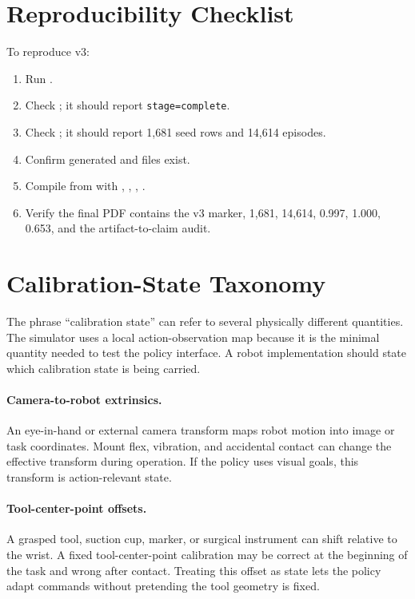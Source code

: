 \documentclass{article}
\begin{document}
\section{Reproducibility Checklist}

To reproduce v3:
\begin{enumerate}[leftmargin=*]
\item Run .
\item Check ; it should report
\texttt{stage=complete}.
\item Check ; it should report 1,681
seed rows and 14,614 episodes.
\item Confirm generated  and  files exist.
\item Compile from  with , ,
, .
\item Verify the final PDF contains the v3 marker, 1,681, 14,614, 0.997,
1.000, 0.653, and the artifact-to-claim audit.
\end{enumerate}

\section{Calibration-State Taxonomy}

The phrase ``calibration state'' can refer to several physically different
quantities. The simulator uses a local action-observation map because it is the
minimal quantity needed to test the policy interface. A robot implementation
should state which calibration state is being carried.

\paragraph{Camera-to-robot extrinsics.}
An eye-in-hand or external camera transform maps robot motion into image or
task coordinates. Mount flex, vibration, and accidental contact can change the
effective transform during operation. If the policy uses visual goals, this
transform is action-relevant state.

\paragraph{Tool-center-point offsets.}
A grasped tool, suction cup, marker, or surgical instrument can shift relative
to the wrist. A fixed tool-center-point calibration may be correct at the
beginning of the task and wrong after contact. Treating this offset as state
lets the policy adapt commands without pretending the tool geometry is fixed.
\end{document}
